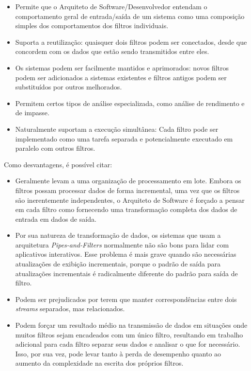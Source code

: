 \documentclass[portugues]{ic-tese}
\begin{document}
\begin{itemize}
\item Permite que o Arquiteto de Software/Desenvolvedor entendam o comportamento geral de entrada/saída de um sistema como uma composição simples dos comportamentos dos filtros individuais.
\item Suporta a reutilização: quaisquer dois filtros podem ser conectados, desde que concordem com os dados que estão sendo transmitidos entre eles. 
\item Os sistemas podem ser facilmente mantidos e aprimorados: novos filtros podem ser adicionados a sistemas existentes e filtros antigos podem ser substituídos por outros melhorados.
\item Permitem certos tipos de análise especializada, como análise de rendimento e de impasse.
\item Naturalmente suportam a execução simultânea: Cada filtro pode ser implementado como uma tarefa separada e potencialmente executado em paralelo com outros filtros.
\end{itemize}

Como desvantagens, é possível citar:

\begin{itemize}
\item Geralmente levam a uma organização de processamento em lote. Embora os filtros possam processar dados de forma incremental, uma vez que os filtros são inerentemente independentes, o Arquiteto de Software é forçado a pensar em cada filtro como fornecendo uma transformação completa dos dados de entrada em dados de saída. 
\item Por sua natureza de transformação de dados, os sistemas que usam a arquitetura \textit{Pipes-and-Filters} normalmente não são bons para lidar com aplicativos interativos. Esse problema é mais grave quando são necessárias atualizações de exibição incrementais, porque o padrão de saída para atualizações incrementais é radicalmente diferente do padrão para saída de filtro.
\item Podem ser prejudicados por terem que manter correspondências entre dois \textit{streams} separados, mas relacionados. 
\item Podem forçar um resultado médio na transmissão de dados em situações onde muitos filtros sejam encadeados com um único filtro, resultando em trabalho adicional para cada filtro separar seus dados e analisar o que for necessário. Isso, por sua vez, pode levar tanto à perda de desempenho quanto ao aumento da complexidade na escrita dos próprios filtros.
\end{itemize}
\end{document}
